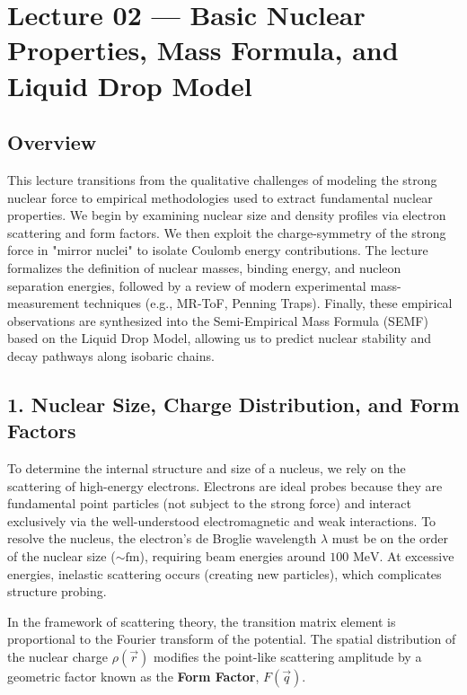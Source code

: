 



\section{Lecture 02 — Basic Nuclear Properties, Mass Formula, and Liquid Drop Model}
\label{sec:lec02:nuclear_properties}

\subsection*{Overview}
This lecture transitions from the qualitative challenges of modeling the strong nuclear force to empirical methodologies used to extract fundamental nuclear properties. We begin by examining nuclear size and density profiles via electron scattering and form factors. We then exploit the charge-symmetry of the strong force in "mirror nuclei" to isolate Coulomb energy contributions. The lecture formalizes the definition of nuclear masses, binding energy, and nucleon separation energies, followed by a review of modern experimental mass-measurement techniques (e.g., MR-ToF, Penning Traps). Finally, these empirical observations are synthesized into the Semi-Empirical Mass Formula (SEMF) based on the Liquid Drop Model, allowing us to predict nuclear stability and decay pathways along isobaric chains.

\subsection*{1. Nuclear Size, Charge Distribution, and Form Factors}
To determine the internal structure and size of a nucleus, we rely on the scattering of high-energy electrons. 
Electrons are ideal probes because they are fundamental point particles (not subject to the strong force) and interact exclusively via the well-understood electromagnetic and weak interactions. To resolve the nucleus, the electron's de Broglie wavelength $\lambda$ must be on the order of the nuclear size ($\sim \text{fm}$), requiring beam energies around $100 \text{ MeV}$. At excessive energies, inelastic scattering occurs (creating new particles), which complicates structure probing.

In the framework of scattering theory, the transition matrix element is proportional to the Fourier transform of the potential. The spatial distribution of the nuclear charge $\rho(\vec{r})$ modifies the point-like scattering amplitude by a geometric factor known as the \textbf{Form Factor}, $F(\vec{q})$.

